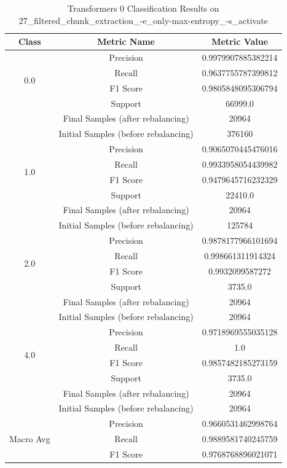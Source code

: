\begin{longtable}{|c|c|c|}
\caption{Transformers 0 Classification Results on 27\_filtered\_chunk\_extraction\_-e\_only-max-entropy\_-s\_activate} \label{tab:27_filtered_chunk_extraction_-e_only-max-entropy_-s_activate_transformers_0_classifiers_results} \\
\hline
Class & Metric Name & Metric Value \\
\hline
\multirow{4}{*}{0.0} & Precision & 0.9979907885382214 \\
 & Recall & 0.9637755787399812 \\
 & F1 Score & 0.9805848095306794 \\
 & Support & 66999.0 \\
 & Final Samples (after rebalancing) & 20964 \\
 & Initial Samples (before rebalancing) & 376160 \\
\hline
\multirow{4}{*}{1.0} & Precision & 0.9065070445476016 \\
 & Recall & 0.9933958054439982 \\
 & F1 Score & 0.9479645716232329 \\
 & Support & 22410.0 \\
 & Final Samples (after rebalancing) & 20964 \\
 & Initial Samples (before rebalancing) & 125784 \\
\hline
\multirow{4}{*}{2.0} & Precision & 0.9878177966101694 \\
 & Recall & 0.998661311914324 \\
 & F1 Score & 0.9932099587272 \\
 & Support & 3735.0 \\
 & Final Samples (after rebalancing) & 20964 \\
 & Initial Samples (before rebalancing) & 20964 \\
\hline
\multirow{4}{*}{4.0} & Precision & 0.9718969555035128 \\
 & Recall & 1.0 \\
 & F1 Score & 0.9857482185273159 \\
 & Support & 3735.0 \\
 & Final Samples (after rebalancing) & 20964 \\
 & Initial Samples (before rebalancing) & 20964 \\
\hline
\multirow{4}{*}{Macro Avg} & Precision & 0.9660531462998764 \\
 & Recall & 0.9889581740245759 \\
 & F1 Score & 0.9768768896021071 \\

\end{longtable}
